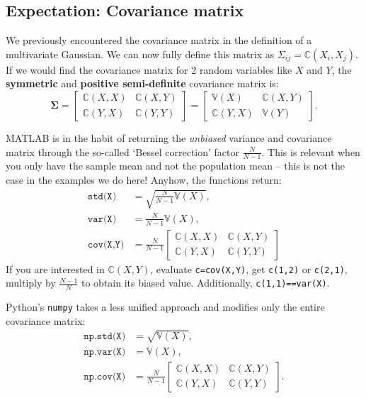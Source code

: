 \documentclass{article}
\begin{document}
\subsection{Expectation: Covariance matrix}
We previously encountered the covariance matrix in the definition of a multivariate Gaussian. We can now fully define this matrix as $\Sigma_{ij}=\mathbb{C}(X_i,X_j)$. If we would find the covariance matrix for 2 random variables like $X$ and $Y$, the \textbf{symmetric} and \textbf{positive semi-definite} covariance matrix is:
\begin{equation}
    \bm{\Sigma} = \left[ \begin{array}{cc} \mathbb{C}(X,X) & \mathbb{C}(X,Y) \\
    \mathbb{C}(Y,X) & \mathbb{C}(Y,Y)\end{array} \right] = \left[ \begin{array}{cc} \mathbb{V}(X) & \mathbb{C}(X,Y) \\
    \mathbb{C}(Y,X) & \mathbb{V}(Y)\end{array} \right].
\end{equation}
\begin{spexample}
    MATLAB is in the habit of returning the \textit{unbiased} variance and covariance matrix through the so-called `Bessel correction' factor $\frac{N}{N-1}$. This is relevant when you only have the sample mean and not the population mean -- this is not the case in the examples we do here! Anyhow, the functions return:
    \begin{align}
        \texttt{std(X)} &= \sqrt{\frac{N}{N-1}\mathbb{V}(X)},\\
        \texttt{var(X)} &= \frac{N}{N-1}\mathbb{V}(X),\\
        \texttt{cov(X,Y)}&=\frac{N}{N-1}\left[ \begin{array}{cc} \mathbb{C}(X,X) & \mathbb{C}(X,Y) \\
    \mathbb{C}(Y,X) & \mathbb{C}(Y,Y)\end{array} \right]
    \end{align}
    If you are interested in $\mathbb{C}(X,Y)$, evaluate \texttt{c=cov(X,Y)}, get \texttt{c(1,2)} or \texttt{c(2,1)}, multiply by $\frac{N-1}{N}$ to obtain its biased value. Additionally, \texttt{c(1,1)==var(X)}.
\end{spexample}
\begin{spexample}
    Python's \texttt{numpy} takes a less unified approach and modifies only the entire covariance matrix:
    \begin{align}
        \texttt{np.std(X)}& = \sqrt{\mathbb{V}(X)},\\
        \texttt{np.var(X)}& = \mathbb{V}(X),\\
        \texttt{np.cov(X)}&=\frac{N}{N-1}\left[ \begin{array}{cc} \mathbb{C}(X,X) & \mathbb{C}(X,Y) \\
   \mathbb{C}(Y,X) & \mathbb{C}(Y,Y)\end{array} \right].
    \end{align}
\end{spexample}
\end{document}
